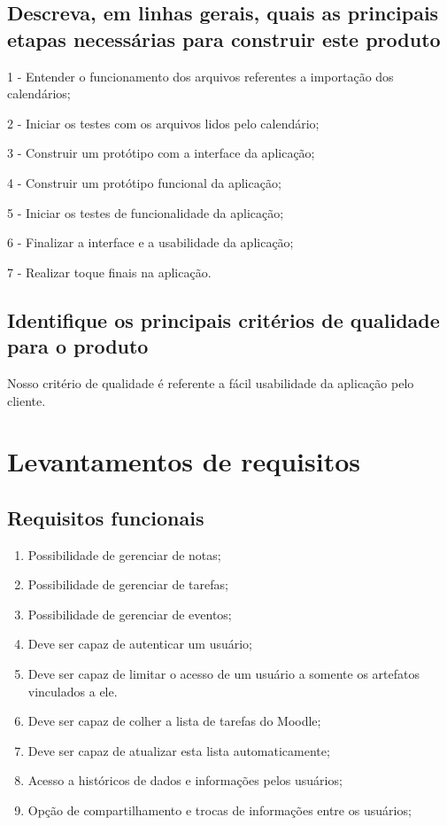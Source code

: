\documentclass[
	12pt,				%
	openright,			%
	oneside,			    %
	a4paper,				%
	english,			%
	french,			%
	spanish,			%
	brazil			%
	]{abntex2}
\begin{document}
\section{Descreva, em linhas gerais, quais as principais etapas necessárias para construir este produto}
1 - Entender o funcionamento dos arquivos referentes a importação dos calendários;

2 - Iniciar os testes com os arquivos lidos pelo calendário;

3 - Construir um protótipo com a interface da aplicação;

4 - Construir um protótipo funcional da aplicação;

5 - Iniciar os testes de funcionalidade da aplicação;

6 - Finalizar a interface e a usabilidade da aplicação;

7 - Realizar toque finais na aplicação.
\section{Identifique os principais critérios de qualidade para o produto}
Nosso critério de qualidade é referente a fácil usabilidade da aplicação pelo cliente.
\chapter{Levantamentos de requisitos}
\section{Requisitos funcionais}
\begin{enumerate}
    \item Possibilidade de gerenciar de notas;
    \item Possibilidade de gerenciar de tarefas;
    \item Possibilidade de gerenciar de eventos;
    \item Deve ser capaz de autenticar um usuário;
    \item Deve ser capaz de limitar o acesso de um usuário a somente os artefatos vinculados a ele.
    \item Deve ser capaz de colher a lista de tarefas do Moodle;
    \item Deve ser capaz de atualizar esta lista automaticamente;
    \item Acesso a históricos de dados e informações pelos usuários;
    \item Opção de compartilhamento e trocas de informações entre os usuários;
\end{enumerate}
\end{document}
